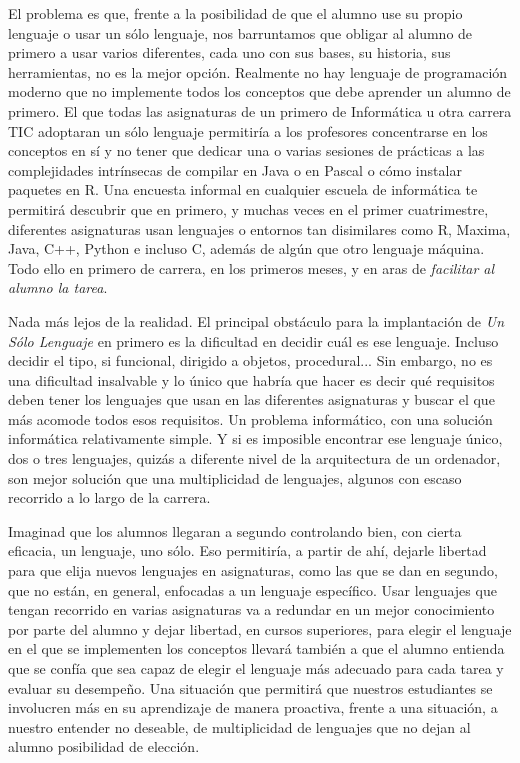 \documentclass[twoside,10pt]{article}
\newcounter{vol}
\begin{document}
\begin{multicols}{2}
El problema es que, frente a la posibilidad de que el alumno use su
propio lenguaje o usar un sólo lenguaje, nos barruntamos que obligar
al alumno de primero a usar varios diferentes, cada uno con
sus bases, su historia, sus herramientas, no es la mejor opción. 
Realmente no hay lenguaje de programación moderno que no
implemente todos los conceptos que debe aprender un alumno de
primero. El que todas las asignaturas de un primero de Informática u
otra carrera TIC adoptaran un sólo lenguaje permitiría a los profesores
concentrarse en los conceptos en sí y no tener que dedicar una o
varias sesiones de prácticas a las complejidades intrínsecas de
compilar en Java o en Pascal o cómo instalar paquetes en R. Una
encuesta informal en cualquier escuela de informática te permitirá
descubrir que en primero, y muchas veces en el primer cuatrimestre,
diferentes asignaturas usan lenguajes o entornos tan disimilares como
R, Maxima, Java, C++, \mbox{Python} e incluso C, además de algún
que otro lenguaje máquina. Todo ello en primero de carrera, en los
primeros meses, y en aras de \emph{facilitar al alumno la tarea}. 

Nada más lejos de la realidad. El principal obstáculo para la
implantación de \emph{Un Sólo Lenguaje} en primero es la dificultad
en decidir cuál es ese lenguaje. Incluso decidir el tipo, si
funcional, dirigido a objetos, procedural... Sin embargo, no es una
dificultad insalvable y lo único que habría que hacer es decir qué
requisitos deben tener los lenguajes que usan en las diferentes
asignaturas y buscar el que más acomode todos esos requisitos. 
Un problema informático, con una solución informática relativamente
simple. Y si es imposible encontrar ese lenguaje único, dos o tres
lenguajes, quizás a diferente nivel de la arquitectura de un
ordenador, son mejor solución que una multiplicidad de lenguajes,
algunos con escaso recorrido a lo largo de la carrera.

Imaginad que los alumnos llegaran a segundo controlando bien, con cierta
eficacia, un lenguaje, uno sólo. Eso permitiría, a partir de ahí,
dejarle libertad para que elija nuevos lenguajes en asignaturas, como
las que se dan en segundo, que no están, en general, enfocadas a un
lenguaje específico. Usar lenguajes que tengan recorrido en varias
asignaturas va a redundar en un mejor conocimiento por parte del alumno y
dejar libertad, en cursos superiores, para elegir el lenguaje en el
que se implementen los conceptos llevará también a que el alumno
entienda que se confía que sea capaz de elegir el lenguaje más
adecuado para cada tarea y evaluar su desempeño. Una situación que
permitirá que nuestros estudiantes se involucren más en su aprendizaje
de manera proactiva, frente a una situación, a nuestro entender no
deseable, de multiplicidad de lenguajes que no dejan al alumno posibilidad
de elección.


\end{multicols}
\end{document}
